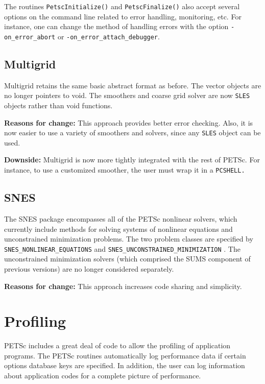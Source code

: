 The routines {\tt PetscInitialize()} and {\tt PetscFinalize()} also accept
several options on the command line related to error handling, monitoring,
etc. For instance, one can change the method of handling errors with the
option {\tt -on\_error\_abort} or {\tt -on\_error\_attach\_debugger}.

\section{Multigrid}

Multigrid retains the same basic abstract format as before. The vector 
objects are no longer pointers to void. The smoothers and coarse grid 
solver are now {\tt SLES} objects rather than void functions.  

{\bf Reasons for change:} This approach provides better error checking.  
Also, it is now easier to use a variety of smoothers and solvers, since 
any {\tt SLES} object can be used. 

{\bf Downside:} Multigrid is now more tightly integrated with the rest 
of PETSc.  For instance, to use a customized smoother, the user must wrap 
it in a {\tt PCSHELL.}

\section{SNES}

The SNES package encompasses all of the PETSc nonlinear solvers, which 
currently include methods for solving systems of nonlinear equations and 
unconstrained minimization problems. The two problem classes are specified
by {\tt SNES\_NONLINEAR\_EQUATIONS} and 
{\tt SNES\_UNCONSTRAINED\_MINIMIZATION} 
.
The unconstrained minimization solvers (which comprised the SUMS
component of previous versions) are no longer considered separately.

{\bf Reasons for change:} This approach increases code sharing and simplicity.

\chapter{Profiling} 
\label{ch:profiling}

PETSc includes a great deal of code to allow the profiling of
application programs.  The PETSc routines automatically log
performance data if certain options database keys are specified.
In addition, the user can log information about application codes
for a complete picture of performance.

